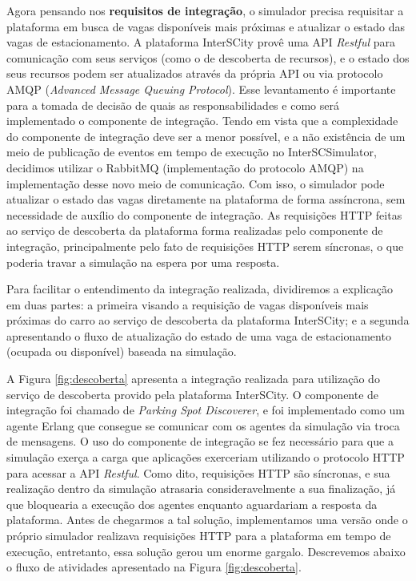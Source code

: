 Agora pensando nos \textbf{requisitos de integração}, o simulador precisa requisitar a plataforma em busca de vagas disponíveis mais próximas e atualizar o estado
das vagas de estacionamento.
A plataforma InterSCity provê uma API \textit{Restful} para comunicação com seus serviços (como o de descoberta de recursos), e o estado dos seus recursos podem ser
atualizados através da própria API ou via protocolo AMQP (\textit{Advanced Message Queuing Protocol}).
Esse levantamento é importante para a tomada de decisão de quais as responsabilidades e como será implementado o componente de integração.
Tendo em vista que a complexidade do componente de integração deve ser a menor possível, e a não existência de um meio de publicação de eventos em tempo de execução
no InterSCSimulator, decidimos utilizar o RabbitMQ (implementação do protocolo AMQP) na implementação desse novo meio de comunicação.
Com isso, o simulador pode atualizar o estado das vagas diretamente na plataforma de forma assíncrona, sem necessidade de auxílio do componente de integração.
As requisições HTTP feitas ao serviço de descoberta da plataforma forma realizadas pelo componente de integração, principalmente pelo fato de requisições HTTP serem
síncronas, o que poderia travar a simulação na espera por uma resposta.

Para facilitar o entendimento da integração realizada, dividiremos a explicação em duas partes: a primeira visando a requisição de vagas disponíveis mais próximas
do carro ao serviço de descoberta da plataforma InterSCity; e a segunda apresentando o fluxo de atualização do estado de uma vaga de estacionamento (ocupada
ou disponível) baseada na simulação.

A Figura \ref{fig:descoberta} apresenta a integração realizada para utilização do serviço de descoberta provido pela plataforma InterSCity.
O componente de integração foi chamado de \textit{Parking Spot Discoverer}, e foi implementado como um agente Erlang que consegue se comunicar com os agentes da
simulação via troca de mensagens.
O uso do componente de integração se fez necessário para que a simulação exerça a carga que aplicações exerceriam utilizando o protocolo HTTP para acessar
a API \textit{Restful}.
Como dito, requisições HTTP são síncronas, e sua realização dentro da simulação atrasaria consideravelmente a sua finalização, já que bloquearia a
execução dos agentes enquanto aguardariam a resposta da plataforma.
Antes de chegarmos a tal solução, implementamos uma versão onde o próprio simulador realizava requisições HTTP para a plataforma em tempo de execução, entretanto,
essa solução gerou um enorme gargalo.
Descrevemos abaixo o fluxo de atividades apresentado na Figura \ref{fig:descoberta}.

